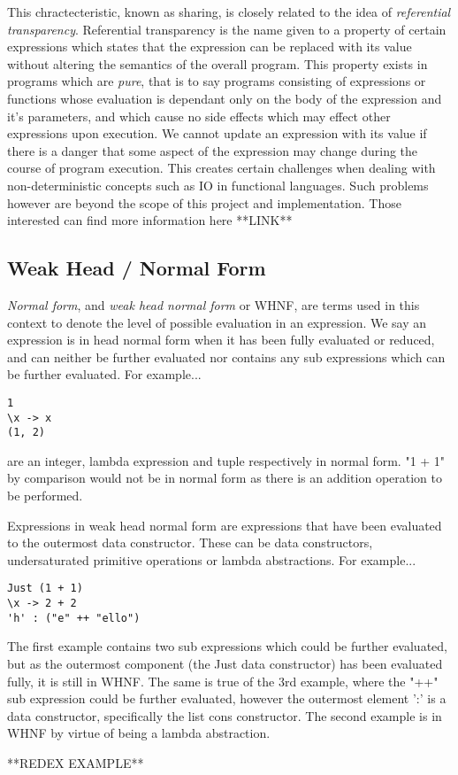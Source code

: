 This chractecteristic, known as sharing, is closely related to the idea
of \emph{referential transparency}. Referential transparency is the name
given to a property of certain expressions which states that the expression
can be replaced with its value without altering the semantics of the overall
program. This property exists in programs which are \emph{pure}, that is to
say programs consisting of expressions or functions whose evaluation is 
dependant only on the body of the expression and it's parameters, and which
cause no side effects which may effect other expressions upon execution. 
We cannot update an expression with its value if there is a danger that
some aspect of the expression may change during the course of program 
execution. This creates certain challenges when dealing with non-deterministic
concepts such as IO in functional languages. Such problems however are 
beyond the scope of this project and implementation. Those interested can
find more information here **LINK**

\subsection{Weak Head / Normal Form}
\emph{Normal form}, and \emph{weak head normal form} or WHNF, are terms used
in this context to denote the level of possible evaluation in an expression.
We say an expression is in head normal form when it has been fully evaluated
or reduced, and can neither be further evaluated nor contains any sub
expressions which can be further evaluated. For example...
\begin{verbatim}
1
\x -> x
(1, 2)
\end{verbatim}
are an integer, lambda expression and tuple respectively in normal form. "1 + 1"
by comparison would not be in normal form as there is an addition operation to
be performed.

Expressions in weak head normal form are expressions that have been evaluated
to the outermost data constructor. These can be data constructors, undersaturated
primitive operations or lambda abstractions. For example...
\begin{verbatim}
Just (1 + 1)
\x -> 2 + 2
'h' : ("e" ++ "ello")
\end{verbatim}
The first example contains two sub expressions which could be further evaluated,
but as the outermost component (the Just data constructor) has been evaluated 
fully, it is still in WHNF. The same is true of the 3rd example, where the "++"
sub expression could be further evaluated, however the outermost element
':' is a data constructor, specifically the list cons constructor. The second
example is in WHNF by virtue of being a lambda abstraction.


**REDEX EXAMPLE**